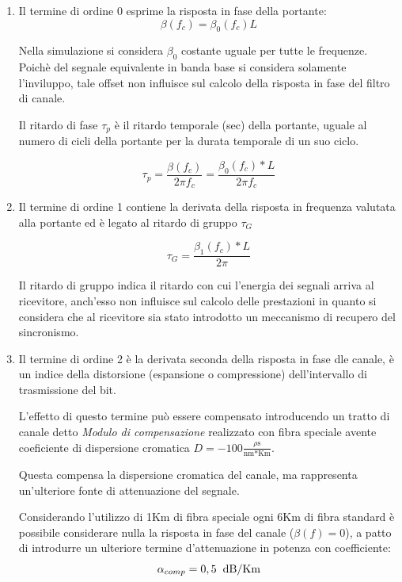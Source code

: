 \documentclass[12pt, a4paper]{article}
\begin{document}
\begin{enumerate}
	\item Il termine di ordine 0 esprime la risposta in fase della portante:
	\begin{equation}
		\beta(f_c) = \beta_0(f_c)L
	\end{equation}
	
	Nella simulazione si considera $\beta_0$ costante uguale per tutte le frequenze. Poichè del segnale equivalente in banda base si considera solamente l'inviluppo, tale offset non influisce sul calcolo della risposta in fase del filtro di canale.
	
	Il ritardo di fase $\tau_p$ è il ritardo temporale (sec) della portante, uguale al numero di cicli della portante per la durata temporale di un suo ciclo.
	
	
	\begin{equation}
		\tau_p = \frac{\beta(f_c)}{2\pi f_c} = \frac{\beta_0(f_c)
		*L}{2\pi f_c}
	\end{equation}

	\item Il termine di ordine 1 contiene la derivata della risposta in frequenza valutata alla portante ed è legato al ritardo di gruppo $\tau_G$
	
	\begin{equation}
		\tau_G = \frac{\beta_1(f_c)*L}{2\pi}
	\end{equation}

		Il ritardo di gruppo indica il ritardo con cui l'energia dei segnali arriva al ricevitore, anch'esso non influisce sul calcolo delle prestazioni in quanto si considera che al ricevitore sia stato introdotto un meccanismo di recupero del sincronismo. 

	\item Il termine di ordine 2 è la derivata seconda della risposta in fase dle canale, è un indice della distorsione (espansione o compressione) dell'intervallo di trasmissione del bit.
	
	L'effetto di questo termine può essere compensato introducendo un tratto di canale detto \textit{Modulo di compensazione} realizzato con fibra speciale avente coeficiente di dispersione cromatica $D = -100\frac{\rho\text{s}}{\text{nm*Km}}$.
	
	Questa compensa la dispersione cromatica del canale, ma rappresenta un'ulteriore fonte di attenuazione del segnale.
	
	Considerando l'utilizzo di 1Km di fibra speciale ogni 6Km di fibra standard è possibile considerare nulla la risposta in fase del canale ($\beta(f) = 0$), a patto di introdurre un ulteriore termine d'attenuazione in potenza con coefficiente:
	\begin{equation}
		\alpha_{comp} = 0,5 \hspace{0.2cm} \text{dB/Km}
	\end{equation} 
		
\end{enumerate}
\end{document}

